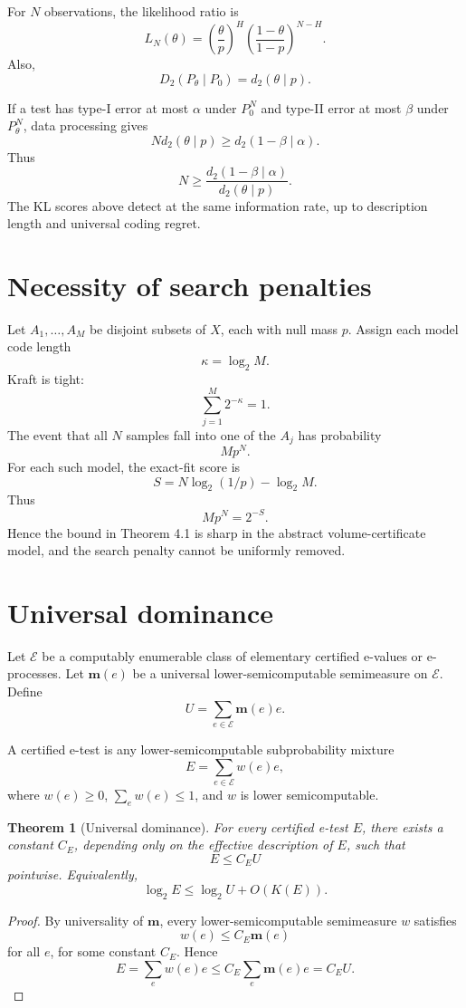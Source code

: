 \documentclass[11pt]{article}
\newtheorem{theorem}{Theorem}[section]
\begin{document}
For $N$ observations, the likelihood ratio is
\[
L_N(\theta)
=
\left(\frac{\theta}{p}\right)^H
\left(\frac{1-\theta}{1-p}\right)^{N-H}.
\]
Also,
\[
D_2(P_\theta\mid P_0)=d_2(\theta\mid p).
\]

If a test has type-I error at most $\alpha$ under $P_0^N$ and type-II error at most $\beta$ under $P_\theta^N$, data processing gives
\[
N d_2(\theta\mid p)
\ge
d_2(1-\beta\mid\alpha).
\]
Thus
\[
N\ge
\frac{d_2(1-\beta\mid\alpha)}
{d_2(\theta\mid p)}.
\]
The KL scores above detect at the same information rate, up to description length and universal coding regret.

\section{Necessity of search penalties}

Let $A_1,\dots,A_M$ be disjoint subsets of $X$, each with null mass $p$. Assign each model code length
\[
\kappa=\log_2M.
\]
Kraft is tight:
\[
\sum_{j=1}^M2^{-\kappa}=1.
\]
The event that all $N$ samples fall into one of the $A_j$ has probability
\[
Mp^N.
\]
For each such model, the exact-fit score is
\[
S=N\log_2(1/p)-\log_2M.
\]
Thus
\[
Mp^N=2^{-S}.
\]
Hence the bound in Theorem 4.1 is sharp in the abstract volume-certificate model, and the search penalty cannot be uniformly removed.

\section{Universal dominance}

Let $\mathcal E$ be a computably enumerable class of elementary certified e-values or e-processes. Let $\mathbf m(e)$ be a universal lower-semicomputable semimeasure on $\mathcal E$. Define
\[
U=\sum_{e\in\mathcal E}\mathbf m(e)e.
\]

A certified e-test is any lower-semicomputable subprobability mixture
\[
E=\sum_{e\in\mathcal E}w(e)e,
\]
where $w(e)\ge0$, $\sum_e w(e)\le1$, and $w$ is lower semicomputable.

\begin{theorem}[Universal dominance]
For every certified e-test $E$, there exists a constant $C_E$, depending only on the effective description of $E$, such that
\[
E\le C_EU
\]
pointwise. Equivalently,
\[
\log_2E\le \log_2U+O(K(E)).
\]
\end{theorem}

\begin{proof}
By universality of $\mathbf m$, every lower-semicomputable semimeasure $w$ satisfies
\[
w(e)\le C_E\mathbf m(e)
\]
for all $e$, for some constant $C_E$. Hence
\[
E=\sum_ew(e)e
\le
C_E\sum_e\mathbf m(e)e
=
C_EU.
\]
\end{proof}
\end{document}
